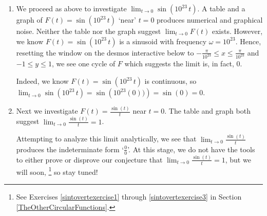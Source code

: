 \documentclass{ximera}
\begin{document}
\begin{example}
\begin{explanation}
\begin{enumerate}
 Indeed, as $t \rightarrow 0^{-}$, $\frac{\pi}{t} \rightarrow -\infty$ and as $t \rightarrow 0^{+}$, $\frac{\pi}{t} \rightarrow \infty$.  In other words, all of the infinite oscillations experienced by the standard sine function, $f(t) = \sin(t)$ as $t \rightarrow -\infty$ and as $t \rightarrow \infty$ are being brought  back to near  $t = 0$ in $F(t) = \sin\left( \frac{\pi}{t} \right)$.  Hence, $\lim_{t \rightarrow 0} \sin\left( \frac{\pi}{t} \right)$ does not exist.


\item  We proceed as above to investigate $ \lim_{t \rightarrow 0} \sin\left( 10^{23} \, t \right)$.    A table and  a graph of  $F(t) = \sin \left( 10^{23} \, t\right)$  `near' $t = 0$ produces numerical and graphical noise.  Neither the table nor the graph suggest $\lim_{t \rightarrow 0} F(t)$ exists.  However, we know  $F(t) = \sin \left( 10^{23} \, t\right)$ is a sinusoid with frequency $\omega = 10^{23}$.  Hence, resetting the window on the desmos interactive below to $-\frac{\pi}{10^{23}} \leq x \leq \frac{\pi}{10^{23}}$ and $-1 \leq y \leq 1$, we see one cycle of $F$ which suggests the limit is, in fact, $0$.

\begin{center}
\end{center}



Indeed, we know  $F(t) = \sin \left( 10^{23} \, t\right)$ is continuous, so $\lim_{t \rightarrow 0} \sin\left( 10^{23} \, t \right) = \sin\left(10^{23} (0)) \right) = \sin(0) = 0$.   

\item  Next we investigate  $F(t) =  \frac{\sin(t)}{t}$ near $t=0$.   The table and graph both suggest   $\lim_{t \rightarrow 0} \frac{\sin(t)}{t} = 1$. 


\begin{center}
 \end{center}
 
 Attempting to analyze this limit analytically, we see that  $\lim_{t \rightarrow 0} \frac{\sin(t)}{t}$ produces the indeterminate form `$\frac{0}{0}$'.  At this stage, we do not have the tools to either prove or disprove our conjecture that  $\lim_{t \rightarrow 0} \frac{\sin(t)}{t} = 1$,  but we will soon, \footnote{See Exercises \ref{sintovertexercise1} through \ref{sintovertexercise3} in Section \ref{TheOtherCircularFunctions}.} so stay tuned! 

\end{enumerate}
\end{explanation}
\end{example}




\closegraphsfile
\end{document}
